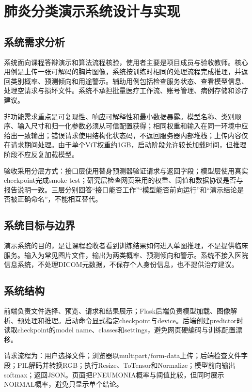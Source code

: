 \chapter{肺炎分类演示系统设计与实现}

\section{系统需求分析}

系统面向课程答辩演示和算法流程核验，使用者主要是项目成员与验收教师。核心用例是上传一张可解码的胸片图像，系统按训练时相同的处理流程完成推理，并返回类别概率、预测倾向和用途警示。辅助用例包括检查服务状态、查看模型信息、处理空请求与损坏文件。系统不承担批量医疗工作流、账号管理、病例存储和诊疗建议。

非功能需求重点是可复现性、响应可解释性和最小数据暴露。模型名称、类别顺序、输入尺寸和归一化参数必须从可信配置获得；相同权重和输入在同一环境中应给出一致输出；错误请求使用结构化状态码，不返回服务器内部堆栈；上传内容仅在请求期间处理。由于单个ViT权重约1GB，启动阶段允许较长加载时间，但推理阶段不应反复加载模型。

验收采用分层方式：接口层使用替身预测器验证请求与返回字段；模型层使用真实checkpoint完成smoke test；研究层检查网页采用的权重、阈值和数据协议是否与报告说明一致。三层分别回答“接口能否工作”“模型能否前向运行”和“演示结论是否被正确命名”，不能相互替代。

\section{系统目标与边界}

演示系统的目的，是让课程验收者看到训练结果如何进入单图推理，不是提供临床服务。输入为常见图片文件，输出为两类概率、预测倾向和警示。系统不接入医院信息系统，不处理DICOM元数据，不保存个人身份信息，也不提供治疗建议。

\section{系统结构}

前端负责文件选择、预览、请求和结果展示；Flask后端负责模型加载、图像解析、预处理和推理。启动命令显式指定checkpoint与device。后端创建predictor时读取checkpoint的model name、classes和settings，避免网页硬编码与训练配置漂移。

请求流程为：用户选择文件；浏览器以multipart/form-data上传；后端检查文件字段；PIL解码并转换RGB；执行Resize、ToTensor和Normalize；模型前向输出softmax；返回JSON。页面把PNEUMONIA概率与阈值比较，但同时展示NORMAL概率，避免只显示单个结论。

